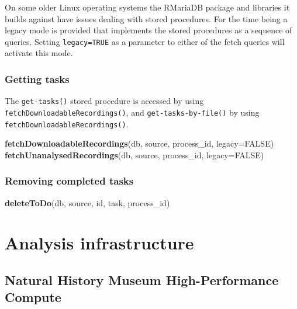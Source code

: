 \documentclass[
]{book}
\newenvironment{Shaded}{\begin{snugshade}}{\end{snugshade}}
\newcommand{\AttributeTok}[1]{\textcolor[rgb]{0.13,0.29,0.53}{#1}}
\newcommand{\ConstantTok}[1]{\textcolor[rgb]{0.56,0.35,0.01}{#1}}
\newcommand{\FunctionTok}[1]{\textcolor[rgb]{0.13,0.29,0.53}{\textbf{#1}}}
\newcommand{\NormalTok}[1]{#1}
\begin{document}
On some older Linux operating systems the RMariaDB package and libraries it builds against have issues dealing with stored procedures. For the time being a legacy mode is provided that implements the stored procedures as a sequence of queries. Setting \texttt{legacy=TRUE} as a parameter to either of the fetch queries will activate this mode.

\hypertarget{getting-tasks}{%
\subsection{Getting tasks}\label{getting-tasks}}

The \texttt{get-tasks()} stored procedure is accessed by using \texttt{fetchDownloadableRecordings()}, and \texttt{get-tasks-by-file()} by using \texttt{fetchDownloadableRecordings()}.

\begin{Shaded}
\begin{Highlighting}[]
\FunctionTok{fetchDownloadableRecordings}\NormalTok{(db, source, process\_id, }\AttributeTok{legacy=}\ConstantTok{FALSE}\NormalTok{)}
\FunctionTok{fetchUnanalysedRecordings}\NormalTok{(db, source, process\_id, }\AttributeTok{legacy=}\ConstantTok{FALSE}\NormalTok{)}
\end{Highlighting}
\end{Shaded}

\hypertarget{removing-completed-tasks}{%
\subsection{Removing completed tasks}\label{removing-completed-tasks}}

\begin{Shaded}
\begin{Highlighting}[]
\FunctionTok{deleteToDo}\NormalTok{(db, source, id, task, process\_id)}
\end{Highlighting}
\end{Shaded}

\hypertarget{analysis-infrastructure}{%
\chapter{Analysis infrastructure}\label{analysis-infrastructure}}

\hypertarget{natural-history-museum-high-performance-compute}{%
\section{Natural History Museum High-Performance Compute}\label{natural-history-museum-high-performance-compute}}
\end{document}

